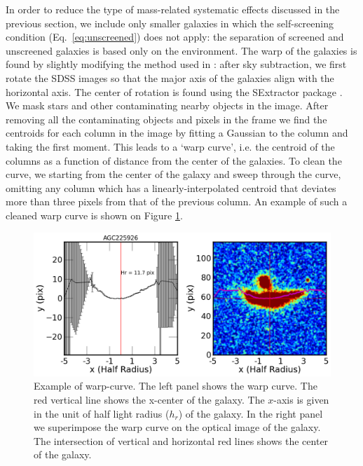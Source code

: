 \documentclass[useAMS,usenatbib,twocolumn]{mn2e}
\begin{document}
In order to reduce the type of mass-related systematic effects discussed in
the previous  section, we include only smaller galaxies in which the
self-screening condition (Eq.\ \ref{eq:unscreened}) does not apply: the
separation of screened and
unscreened galaxies is based only on the environment.
The warp of the galaxies is found by slightly modifying the method used
in \citet{jim97}: after sky subtraction, we first rotate the SDSS images
so that the major axis of the galaxies align with the horizontal axis.
The center of rotation is found using the SExtractor package \citep{bertin96}.
We mask stars and other contaminating
nearby objects in the image. After removing all the contaminating objects and
pixels in the frame we find the centroids
for each column in the image by fitting a Gaussian to the column and taking the
first moment. This leads to a `warp curve', i.e. the centroid of the
columns as a function of distance from the center of the galaxies.
To clean the curve, we starting from the center of the galaxy and
sweep through the curve, omitting any column which has a linearly-interpolated
centroid that deviates more than three pixels from that of the previous column.
An example of such a cleaned warp curve is shown on Figure \ref{warp-eg}.

\begin{figure}
\begin{center}
  \includegraphics[scale=0.5]{figures/AGC225926-warp-curve.png}
\caption{Example of warp-curve. The left panel shows the warp curve. The red
vertical line shows the x-center of the galaxy. The $x$-axis is given in the unit
of half light radius ($h_r$) of the galaxy. In the right panel we superimpose
the warp curve on the optical image of the galaxy. The intersection of vertical
and horizontal red lines shows the center of the galaxy.}
\label{warp-eg}
\end{center}
\end{figure}
\end{document}
